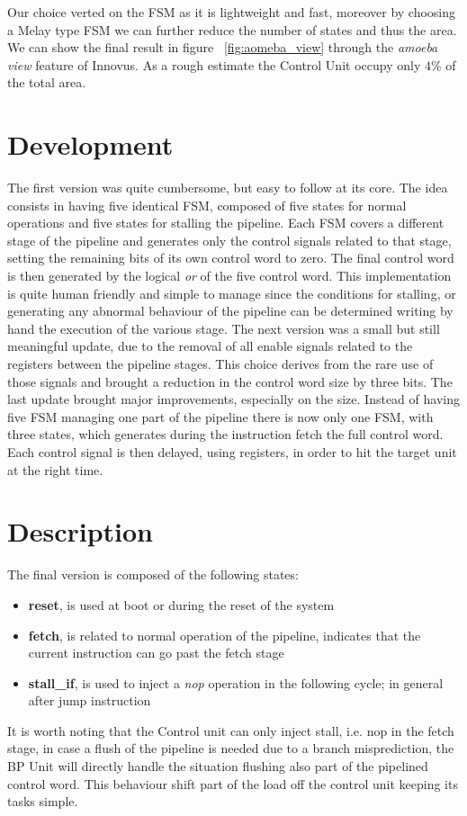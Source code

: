 Our choice verted on the FSM as it is lightweight and fast, moreover by choosing
a Melay type FSM we can further reduce the number of states and thus the area.
We can show the final result in figure ~\ref{fig:aomeba_view} through the 
\textit{amoeba view} feature of Innovus. As a rough estimate the Control Unit 
occupy only $4 \%$ of the total area.

\section{Development}
The first version was quite cumbersome, but easy to follow at its core. The idea
consists in having five identical FSM, composed of five states 
for normal operations and five states for stalling the pipeline. Each FSM
covers a different stage of the pipeline and generates only the control signals
related to that stage, setting the remaining bits of its own control word to
zero. The final control word is then generated by the logical \textit{or} of 
the five control word. This implementation is quite human friendly and simple 
to manage since the conditions for stalling, or generating any abnormal 
behaviour of the pipeline can be determined writing by hand the execution 
of the various stage.
The next version was a small but still meaningful update, due to the removal 
of all enable signals related to the registers between the pipeline stages.
This choice derives from the rare use of those signals and brought a reduction
in the control word size by three bits.
The last update brought major improvements, especially on the size.
Instead of having five FSM managing one part of the pipeline there is now only 
one FSM, with three states, which generates during the instruction fetch the 
full control word. Each control signal is then delayed, using registers, in 
order to hit the target unit at the right time. 

\section{Description} 
The final version is composed of the following states:

\begin{itemize}
	\item \textbf{reset}, is used at boot or during the reset of the system 
	\item \textbf{fetch}, is related to normal operation of the pipeline,
	      indicates that the current instruction can go past the fetch stage
	\item \textbf{stall\_if}, is used to inject a \textit{nop} operation in the
	      following cycle; in general after jump instruction
\end{itemize} 
It is worth noting that the Control unit can only inject stall, i.e. nop in the
fetch stage, in case a flush of the pipeline is needed due to a branch
misprediction, the BP Unit will directly handle the situation flushing also part
of the pipelined control word. This behaviour shift part of the load off the 
control unit keeping its tasks simple.

